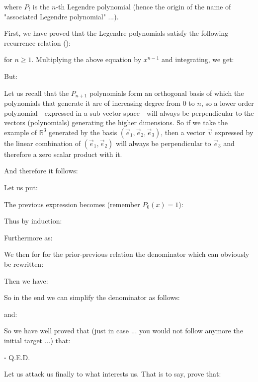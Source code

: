 	where $P_l$ is the $n$-th Legendre polynomial (hence the origin of the name of "associated  Legendre polynomial" ...).
	\begin{dem}
	First, we have proved that the Legendre polynomials satisfy the following recurrence relation ():
	
	for $n\geq 1$.
	Multiplying the above equation by $x^{n-1}$ and integrating, we get:
	
	But:
	
	Let us recall that the $P_{n+1}$ polynomials form an orthogonal basis of which the polynomials that generate it are of increasing degree from $0$ to $n$, so a lower order polynomial - expressed in a sub vector space - will always be perpendicular to the vectors (polynomials) generating the higher dimensions. So if we take the example of $\mathbb{R}^3$ generated by the basis $(\vec{e}_1,\vec{e}_2,\vec{e}_3)$, then a vector $\vec{v}$ expressed by the linear combination of $(\vec{e}_1,\vec{e}_2)$ will always be perpendicular to $\vec{e}_3$ and therefore a zero scalar product with it.

	And  therefore it follows:
	
	Let us put:
	
	The previous expression becomes (remember $P_0(x)=1$):
	
	Thus by induction:
	
	Furthermore as:
	
	We then for for the prior-previous relation the denominator which can obviously be rewritten:
	
	Then we have:
	
	So in the end we can simplify the denominator as follows:
	
	and:
	
	So we have well proved that (just in case ... you would not follow anymore the initial target ...) that:
	
	\begin{flushright}
		$\square$  Q.E.D.
	\end{flushright}
	\end{dem}
	Let us attack us finally to what interests us. That is to say, prove that:
	
